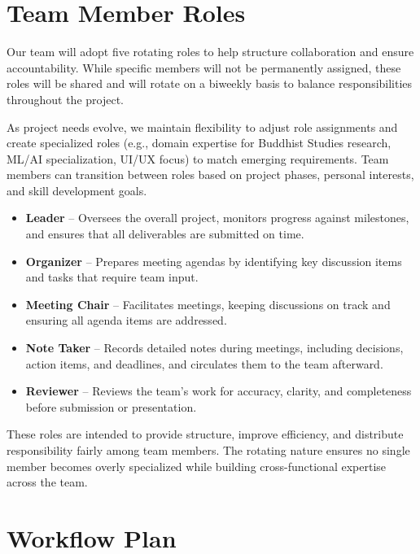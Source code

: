 \documentclass{article}
\begin{document}
\section{Team Member Roles}

Our team will adopt five rotating roles to help structure collaboration and ensure accountability.
While specific members will not be permanently assigned, these roles will be shared and will
rotate on a biweekly basis to balance responsibilities throughout the project.

As project needs evolve, we maintain flexibility to adjust role assignments and create specialized roles
(e.g., domain expertise for Buddhist Studies research, ML/AI specialization, UI/UX focus) to match
emerging requirements. Team members can transition between roles based on project phases, personal
interests, and skill development goals.

\begin{itemize}
    \item \textbf{Leader} -- Oversees the overall project, monitors progress against milestones,
    and ensures that all deliverables are submitted on time.

    \item \textbf{Organizer} -- Prepares meeting agendas by identifying key discussion items
    and tasks that require team input.

    \item \textbf{Meeting Chair} -- Facilitates meetings, keeping discussions on track
    and ensuring all agenda items are addressed.

    \item \textbf{Note Taker} -- Records detailed notes during meetings, including decisions,
    action items, and deadlines, and circulates them to the team afterward.

    \item \textbf{Reviewer} -- Reviews the team’s work for accuracy, clarity, and completeness
    before submission or presentation.
\end{itemize}

These roles are intended to provide structure, improve efficiency,
and distribute responsibility fairly among team members. The rotating nature ensures
no single member becomes overly specialized while building cross-functional expertise
across the team.



\section{Workflow Plan}
\end{document}
